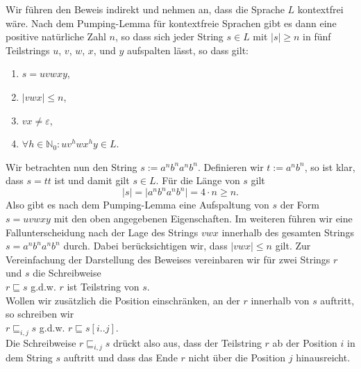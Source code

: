 \solution
Wir f\"uhren den Beweis indirekt und nehmen an, dass die Sprache $L$ kontextfrei
w\"are.  Nach dem Pumping-Lemma f\"ur kontextfreie Sprachen gibt es dann eine positive
nat\"urliche Zahl $n$, so dass sich jeder String $s \in L$ mit $|s| \geq n$ in f\"unf 
Teilstrings $u$, $v$, $w$, $x$, und $y$ aufspalten l\"asst, so dass gilt:
\begin{enumerate}
\item $s = uvwxy$,
\item $|vwx| \leq n$,
\item $vx \not= \varepsilon$,
\item $\forall h \in \mathbb{N}_0: uv^hwx^hy \in L$. 
\end{enumerate} 
Wir betrachten nun den String $s := a^{n}b^{n}a^{n}b^{n}$.  Definieren wir $t:= a^nb^n$,
so ist klar, dass $s = tt$ ist und damit gilt $s \in L$.
F\"ur die L\"ange von $s$ gilt 
\[ |s| = \big| a^{n}b^{n}a^{n}b^{n} \big| = 4 \cdot n \geq n. \]
Also gibt es nach dem Pumping-Lemma eine Aufspaltung von $s$ der Form $s = uvwxy$ mit den
oben angegebenen Eigenschaften. 
Im weiteren f\"uhren wir eine Fallunterscheidung nach der Lage des Strings $vwx$ innerhalb
des gesamten Strings $s = a^{n}b^{n}a^{n}b^{n}$ durch.  Dabei ber\"ucksichtigen wir, dass
$|vwx| \leq n$ gilt.  Zur Vereinfachung der Darstellung des Beweises vereinbaren wir f\"ur zwei Strings
$r$ und $s$ die Schreibweise 
\\[0.2cm]
\hspace*{1.3cm}
$r \sqsubseteq s$ \quad g.d.w. \quad $r$ ist Teilstring von $s$.
\\[0.2cm]
Wollen wir zus\"atzlich die Position einschr\"anken, an der $r$ innerhalb von $s$ auftritt, so
schreiben wir
\\[0.2cm]
\hspace*{1.3cm}
$r \sqsubseteq_{i,j} s$ \quad g.d.w. \quad
$r \sqsubseteq s[i \mathtt{..} j]$. 
\\[0.2cm]
Die Schreibweise $r \sqsubseteq_{i,j} s$ dr\"uckt also aus, dass der Teilstring $r$ ab der
Position $i$ in dem String $s$ auftritt und dass das Ende $r$ nicht \"uber die Position $j$ hinausreicht.


